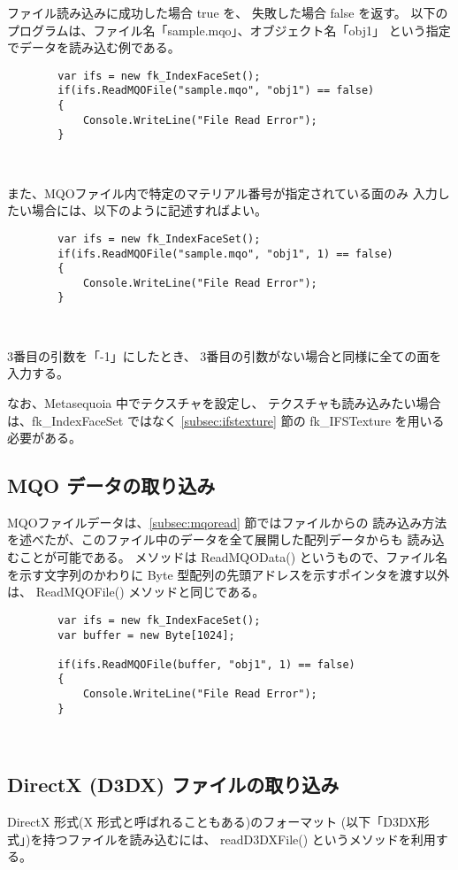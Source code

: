 ファイル読み込みに成功した場合 true を、
失敗した場合 false を返す。
以下のプログラムは、ファイル名「sample.mqo」、オブジェクト名「obj1」
という指定でデータを読み込む例である。
\\
\begin{screen}
\begin{verbatim}
        var ifs = new fk_IndexFaceSet();
        if(ifs.ReadMQOFile("sample.mqo", "obj1") == false)
        {
            Console.WriteLine("File Read Error");
        }
\end{verbatim}
\end{screen} ~

また、MQOファイル内で特定のマテリアル番号が指定されている面のみ
入力したい場合には、以下のように記述すればよい。
\begin{screen}
\begin{verbatim}
        var ifs = new fk_IndexFaceSet();
        if(ifs.ReadMQOFile("sample.mqo", "obj1", 1) == false)
        {
            Console.WriteLine("File Read Error");
        }
\end{verbatim}
\end{screen} ~

3番目の引数を「-1」にしたとき、
3番目の引数がない場合と同様に全ての面を入力する。

なお、Metasequoia 中でテクスチャを設定し、
テクスチャも読み込みたい場合は、fk\_IndexFaceSet ではなく
\ref{subsec:ifstexture} 節の fk\_IFSTexture を用いる必要がある。

\subsection{MQO データの取り込み} \label{subsec:mqodata}
MQOファイルデータは、\ref{subsec:mqoread} 節ではファイルからの
読み込み方法を述べたが、このファイル中のデータを全て展開した配列データからも
読み込むことが可能である。
メソッドは ReadMQOData() というもので、ファイル名を示す文字列のかわりに
Byte 型配列の先頭アドレスを示すポインタを渡す以外は、
ReadMQOFile() メソッドと同じである。
\begin{screen}
\begin{verbatim}
        var ifs = new fk_IndexFaceSet();
        var buffer = new Byte[1024];

        if(ifs.ReadMQOFile(buffer, "obj1", 1) == false)
        {
            Console.WriteLine("File Read Error");
        }
\end{verbatim}
\end{screen} ~

\subsection{DirectX (D3DX) ファイルの取り込み} \label{subsec:d3dxread}
DirectX 形式(X 形式と呼ばれることもある)のフォーマット
(以下「D3DX形式」)を持つファイルを読み込むには、
readD3DXFile() というメソッドを利用する。

